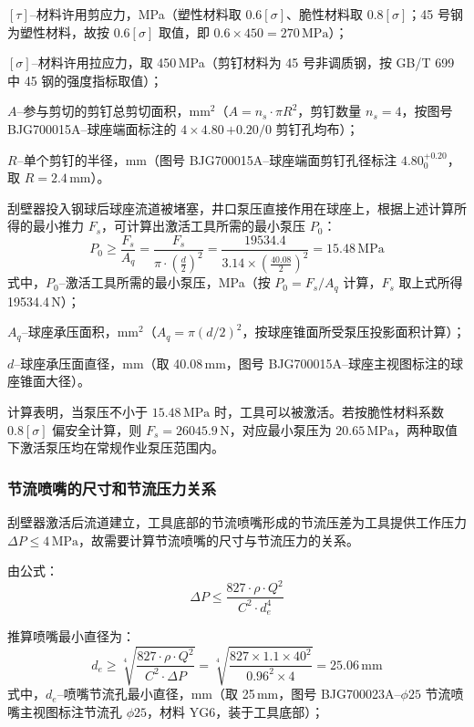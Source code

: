 $[\tau]$--材料许用剪应力，MPa（塑性材料取 $0.6[\sigma]$、脆性材料取 $0.8[\sigma]$；45 号钢为塑性材料，故按 $0.6[\sigma]$ 取值，即 $0.6\times450 = 270\,\mathrm{MPa}$）；

$[\sigma]$--材料许用拉应力，取 450\,MPa（剪钉材料为 45 号非调质钢，按 GB/T 699 中 45 钢的强度指标取值）；

$A$--参与剪切的剪钉总剪切面积，mm$^2$（$A = n_s \cdot \pi R^2$，剪钉数量 $n_s = 4$，按图号 BJG700015A--球座端面标注的 $4\times 4.80\,{+0.20}/0$ 剪钉孔均布）；

$R$--单个剪钉的半径，mm（图号 BJG700015A--球座端面剪钉孔径标注 $4.80^{+0.20}_0$，取 $R = 2.4$\,mm）。

刮壁器投入钢球后球座流道被堵塞，井口泵压直接作用在球座上，根据上述计算所得的最小推力 $F_s$，可计算出激活工具所需的最小泵压 $P_0$：
\begin{equation}
    P_0 \ge \frac{F_s}{A_q} = \frac{F_s}{\pi \cdot \left(\frac{d}{2}\right)^2} = \frac{19534.4}{3.14 \times \left(\frac{40.08}{2}\right)^2} = 15.48\,\mathrm{MPa}
\end{equation}
式中，$P_0$--激活工具所需的最小泵压，MPa（按 $P_0 = F_s/A_q$ 计算，$F_s$ 取上式所得 19534.4\,N）；

$A_q$--球座承压面积，mm$^2$（$A_q = \pi (d/2)^2$，按球座锥面所受泵压投影面积计算）；

$d$--球座承压面直径，mm（取 40.08\,mm，图号 BJG700015A--球座主视图标注的球座锥面大径）。

计算表明，当泵压不小于 $15.48\,\mathrm{MPa}$ 时，工具可以被激活。若按脆性材料系数 $0.8[\sigma]$ 偏安全计算，则 $F_s = 26045.9\,\mathrm{N}$，对应最小泵压为 $20.65\,\mathrm{MPa}$，两种取值下激活泵压均在常规作业泵压范围内。


\subsubsection{节流喷嘴的尺寸和节流压力关系}

刮壁器激活后流道建立，工具底部的节流喷嘴形成的节流压差为工具提供工作压力 $\Delta P \le 4\,\mathrm{MPa}$，故需要计算节流喷嘴的尺寸与节流压力的关系。

由公式：
\begin{equation}
    \Delta P \le \frac{827 \cdot \rho \cdot Q^2}{C^2 \cdot d_e^4}
\end{equation}

推算喷嘴最小直径为：
\begin{equation}
    d_e \ge \sqrt[4]{\frac{827 \cdot \rho \cdot Q^2}{C^2 \cdot \Delta P}} = \sqrt[4]{\frac{827 \times 1.1 \times 40^2}{0.96^2 \times 4}} = 25.06\,\mathrm{mm}
\end{equation}
式中，$d_e$--喷嘴节流孔最小直径，mm（取 25\,mm，图号 BJG700023A--$\phi 25$ 节流喷嘴主视图标注节流孔 $\phi 25$，材料 YG6，装于工具底部）；

